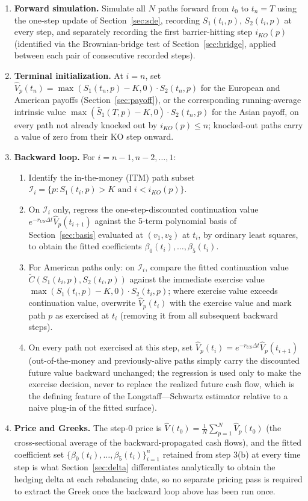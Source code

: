 \documentclass[11pt,a4paper]{article}
\begin{document}
\begin{enumerate}
\item \textbf{Forward simulation.} Simulate all $N$ paths forward from $t_0$ to $t_n=T$ using the one-step update of Section~\ref{sec:sde}, recording $S_1(t_i,p)$, $S_2(t_i,p)$ at every step, and separately recording the first barrier-hitting step $i_{KO}(p)$ (identified via the Brownian-bridge test of Section~\ref{sec:bridge}, applied between each pair of consecutive recorded steps).
\item \textbf{Terminal initialization.} At $i=n$, set $\hat V_p(t_n) = \max(S_1(t_n,p)-K,0)\cdot S_2(t_n,p)$ for the European and American payoffs (Section~\ref{sec:payoff}), or the corresponding running-average intrinsic value $\max(\bar S_1(T,p)-K,0)\cdot S_2(t_n,p)$ for the Asian payoff, on every path not already knocked out by $i_{KO}(p)\le n$; knocked-out paths carry a value of zero from their KO step onward.
\item \textbf{Backward loop.} For $i=n-1,n-2,\ldots,1$:
  \begin{enumerate}
  \item Identify the in-the-money (ITM) path subset $\mathcal I_i = \{p : S_1(t_i,p) > K \text{ and } i < i_{KO}(p)\}$.
  \item On $\mathcal I_i$ only, regress the one-step-discounted continuation value $e^{-r_{US}\Delta t}\hat V_p(t_{i+1})$ against the 5-term polynomial basis of Section~\ref{sec:basis} evaluated at $(v_1,v_2)$ at $t_i$, by ordinary least squares, to obtain the fitted coefficients $\beta_0(t_i),\ldots,\beta_5(t_i)$.
  \item For American paths only: on $\mathcal I_i$, compare the fitted continuation value $\tilde C(S_1(t_i,p),S_2(t_i,p))$ against the immediate exercise value $\max(S_1(t_i,p)-K,0)\cdot S_2(t_i,p)$; where exercise value exceeds continuation value, overwrite $\hat V_p(t_i)$ with the exercise value and mark path $p$ as exercised at $t_i$ (removing it from all subsequent backward steps).
  \item On every path not exercised at this step, set $\hat V_p(t_i) = e^{-r_{US}\Delta t}\hat V_p(t_{i+1})$ (out-of-the-money and previously-alive paths simply carry the discounted future value backward unchanged; the regression is used only to make the exercise decision, never to replace the realized future cash flow, which is the defining feature of the Longstaff---Schwartz estimator relative to a naive plug-in of the fitted surface).
  \end{enumerate}
\item \textbf{Price and Greeks.} The step-0 price is $\hat V(t_0) = \frac{1}{N}\sum_{p=1}^N \hat V_p(t_0)$ (the cross-sectional average of the backward-propagated cash flows), and the fitted coefficient set $\{\beta_0(t_i),\ldots,\beta_5(t_i)\}_{i=1}^{n}$ retained from step 3(b) at every time step is what Section~\ref{sec:delta} differentiates analytically to obtain the hedging delta at each rebalancing date, so no separate pricing pass is required to extract the Greek once the backward loop above has been run once.
\end{enumerate}
\end{document}
